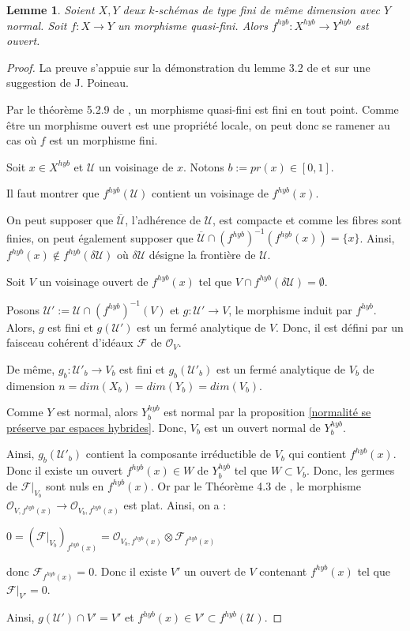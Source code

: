 \documentclass[11pt]{article}
\newtheorem{lem}[thm]{Lemme}
\begin{document}
\begin{lem}\label{morphisme fini sur espace hybride est ouvert}
Soient $X, Y$ deux $k$-schémas de type fini de même dimension avec $Y$ normal. Soit $f : X \rightarrow Y$ un morphisme quasi-fini. Alors $f^{hyb} : X^{hyb} \rightarrow Y^{hyb}$ est ouvert.
\end{lem}

\begin{proof}
La preuve s'appuie sur la démonstration du lemme 3.2 de \cite{BanicaStanasila2} et sur une suggestion de J. Poineau.

Par le théorème 5.2.9 de \cite{LemanissierPoineau}, un morphisme quasi-fini est fini en tout point. Comme être un morphisme ouvert est une propriété locale, on peut donc se ramener au cas où $f$ est un morphisme fini.

Soit $x \in X^{hyb}$ et $\mathcal{U}$ un voisinage de $x$. Notons $b := pr(x) \in [0,1]$.

Il faut montrer que $f^{hyb}(\mathcal{U})$ contient un voisinage de $f^{hyb}(x)$.

On peut supposer que $\overline{\mathcal{U}}$, l'adhérence de $\mathcal{U}$, est compacte et comme les fibres sont finies, on peut également supposer que $\overline{\mathcal{U}} \cap (f^{hyb})^{-1}(f^{hyb}(x)) = \lbrace x\rbrace$. Ainsi, $f^{hyb}(x) \notin f^{hyb}(\delta \mathcal{U})$ où $\delta \mathcal{U}$ désigne la frontière de $\mathcal{U}$.

Soit $V$ un voisinage ouvert de $f^{hyb}(x)$ tel que $V \cap f^{hyb}(\delta \mathcal{U}) = \emptyset$. 

Posons $\mathcal{U}' := \mathcal{U} \cap (f^{hyb})^{-1}(V)$ et $g : \mathcal{U}' \rightarrow V$, le morphisme induit par $f^{hyb}$. Alors, $g$ est fini et $g(\mathcal{U}')$ est un fermé analytique de $V$. Donc, il est défini par un faisceau cohérent d'idéaux $\mathcal{F}$ de $\mathcal{O}_V$.

De même, $g_b : \mathcal{U}'_b \rightarrow V_b$ est fini et $g_b(\mathcal{U}'_b)$ est un fermé analytique de $V_b$ de dimension $n = dim(X_b) = dim(Y_b) = dim(V_b)$. 

Comme $Y$ est normal, alors $Y^{hyb}_b$ est normal par la proposition \ref{normalité se préserve par espaces hybrides}. Donc, $V_b$ est un ouvert normal de $Y^{hyb}_b$.

Ainsi, $g_b(\mathcal{U}'_b)$ contient la composante irréductible de $V_b$ qui contient $f^{hyb}(x)$. Donc il existe un ouvert $f^{hyb}(x) \in W$ de $Y^{hyb}_b$ tel que $W \subset V_b$. Donc, les germes de $\mathcal{F}|_{V_b}$ sont nuls en $f^{hyb}(x)$. Or par le Théorème 4.3 de \cite{Berger}, le morphisme $\mathcal{O}_{V, f^{hyb}(x)} \rightarrow \mathcal{O}_{V_b, f^{hyb}(x)}$ est plat. Ainsi, on a : 
\begin{center}
$0 = (\mathcal{F}|_{V_b})_{f^{hyb}(x)} = \mathcal{O}_{V_b, f^{hyb}(x)} \otimes \mathcal{F}_{f^{hyb}(x)}$
\end{center}
donc $\mathcal{F}_{f^{hyb}(x)} = 0$. Donc il existe $V'$ un ouvert de $V$ contenant $f^{hyb}(x)$ tel que $\mathcal{F}|_{V'}= 0$.

Ainsi, $g(\mathcal{U}') \cap V' = V'$ et $f^{hyb}(x) \in V' \subset f^{hyb}(\mathcal{U})$. 
\end{proof}
\end{document}
